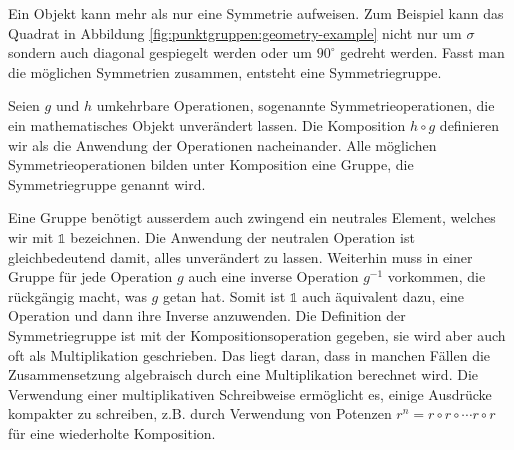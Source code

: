 Ein Objekt kann mehr als nur eine Symmetrie aufweisen.
Zum Beispiel kann das Quadrat in Abbildung \ref{fig:punktgruppen:geometry-example} nicht nur um \(\sigma\) sondern auch diagonal gespiegelt werden oder um \(90^\circ\) gedreht werden.
Fasst man die möglichen Symmetrien zusammen, entsteht eine Symmetriegruppe.

\begin{definition}[Symmetriegruppe]
%
  Seien \(g\) und \(h\) umkehrbare Operationen, sogenannte Symmetrieoperationen, die ein mathematisches Objekt unverändert lassen.
  Die Komposition \(h\circ g\) definieren wir als die Anwendung der Operationen nacheinander.
  Alle möglichen Symmetrieoperationen bilden unter Komposition eine Gruppe, die Symmetriegruppe genannt wird.
%
\end{definition}

Eine Gruppe benötigt ausserdem auch zwingend ein neutrales Element, welches wir mit \(\mathds{1}\) bezeichnen.
%
%
Die Anwendung der neutralen Operation ist gleichbedeutend damit, alles unverändert zu lassen.
Weiterhin muss in einer Gruppe für jede Operation \(g\) auch eine inverse Operation \(g^{-1}\) vorkommen, die rückgängig macht, was \(g\) getan hat.
Somit ist \(\mathds{1}\) auch äquivalent dazu, eine Operation und dann ihre Inverse anzuwenden.
 Die Definition der Symmetriegruppe ist mit der Kompositionsoperation gegeben, sie wird aber auch oft als Multiplikation geschrieben.
Das liegt daran, dass in manchen Fällen die Zusammensetzung algebraisch durch eine Multiplikation berechnet wird.
Die Verwendung einer multiplikativen Schreibweise ermöglicht es, einige Ausdrücke kompakter zu schreiben, z.B.
durch Verwendung von Potenzen \(r^n = r\circ r \circ \cdots r\circ r\) für eine wiederholte Komposition.
%
%

